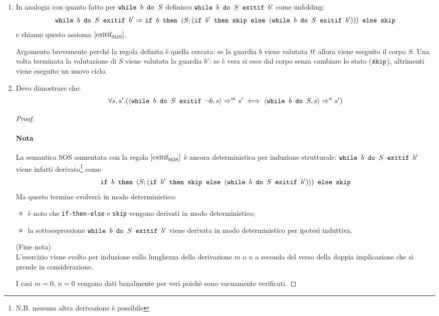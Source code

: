 	\begin{enumerate}
\item In analogia con quanto fatto per $\wbS{b}{S}$ definisco $\wbSE{b}{S}{b'}$ come unfolding:
$$
\wbSE{b}{S}{b'} \Rar{ } \ifABC{b}{(S; (\ifABC{b'}{\skipForFriends}{(\wbSE{b}{S}{b'})}))}{\skipForFriends}
$$
e chiamo questo assioma $\exitifSOS$.

Argomento brevemente perché la regola definita è quella cercata:
se la guardia $b$ viene valutata $\semtrue$ allora viene eseguito il corpo
$S$. Una volta terminata la valutazione di $S$ viene valutata la guardia $b'$:
se è vera si esce dal corpo senza cambiare lo stato ($\skipForFriends$),
altrimenti viene eseguito un nuovo ciclo.

\item Devo dimostrare che:
$$
\forall s, s'. (\confSs{\wbSE{b}{S}{\neg b}}{s} \Rar{m} s'
  \iff
\confSs{\wbS{b}{S}}{s} \Rar{n} s')
$$
\begin{proof} \mbox{ }

\paragraph{Nota} La semantica SOS aumentata con la regola $\exitifSOS$ è ancora
deterministica per induzione strutturale: $\wbSE{b}{S}{b'}$ viene infatti
derivato\footnote{N.B. nessuna altra derivazione è possibile} come
$$
\ifABC{b}{(S; (\ifABC{b'}{\skipForFriends}{(\wbSE{b}{S}{b'})}))}{\skipForFriends}
$$
Ma questo termine evolverà in modo deterministico:
\begin{itemize}
  \item è noto che \texttt{if-then-else} e \texttt{skip} vengono derivati in
    modo deterministico;
  \item la sottoespressione $\wbSE{b}{S}{b'}$ viene derivata in modo
    deterministico per ipotesi induttiva.
\end{itemize}

\noindent(Fine nota) \vspace{1em} \\

L'esercizio viene svolto per induzione sulla lunghezza della derivazione
$m$ o $n$ a seconda del verso della doppia implicazione che si prende in
considerazione.

I casi $m = 0$, $n = 0$ vengono dati banalmente per veri poichè sono
vacuamente verificati.


\end{proof}
\end{enumerate}
